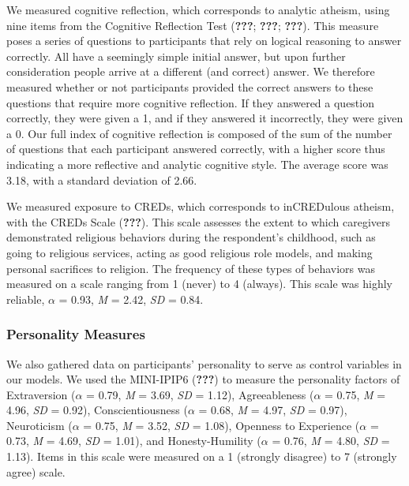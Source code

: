 \documentclass[english,man,mask]{article}
\begin{document}
We measured cognitive reflection, which corresponds to analytic atheism, using nine items from the Cognitive Reflection Test ({\textbf{???}}; {\textbf{???}}; {\textbf{???}}). This measure poses a series of questions to participants that rely on logical reasoning to answer correctly. All have a seemingly simple initial answer, but upon further consideration people arrive at a different (and correct) answer. We therefore measured whether or not participants provided the correct answers to these questions that require more cognitive reflection. If they answered a question correctly, they were given a 1, and if they answered it incorrectly, they were given a 0. Our full index of cognitive reflection is composed of the sum of the number of questions that each participant answered correctly, with a higher score thus indicating a more reflective and analytic cognitive style. The average score was 3.18, with a standard deviation of 2.66.

We measured exposure to CREDs, which corresponds to inCREDulous atheism, with the CREDs Scale ({\textbf{???}}). This scale assesses the extent to which caregivers demonstrated religious behaviors during the respondent's childhood, such as going to religious services, acting as good religious role models, and making personal sacrifices to religion. The frequency of these types of behaviors was measured on a scale ranging from 1 (never) to 4 (always). This scale was highly reliable, \(\alpha\) = 0.93, \emph{M} = 2.42, \emph{SD} = 0.84.

\hypertarget{personality-measures}{%
\subsubsection{Personality Measures}\label{personality-measures}}

We also gathered data on participants' personality to serve as control variables in our models. We used the MINI-IPIP6 ({\textbf{???}}) to measure the personality factors of Extraversion (\(\alpha\) = 0.79, \emph{M} = 3.69, \emph{SD} = 1.12), Agreeableness (\(\alpha\) = 0.75, \emph{M} = 4.96, \emph{SD} = 0.92), Conscientiousness (\(\alpha\) = 0.68, \emph{M} = 4.97, \emph{SD} = 0.97), Neuroticism (\(\alpha\) = 0.75, \emph{M} = 3.52, \emph{SD} = 1.08), Openness to Experience (\(\alpha\) = 0.73, \emph{M} = 4.69, \emph{SD} = 1.01), and Honesty-Humility (\(\alpha\) = 0.76, \emph{M} = 4.80, \emph{SD} = 1.13). Items in this scale were measured on a 1 (strongly disagree) to 7 (strongly agree) scale.
\end{document}
